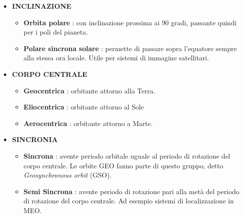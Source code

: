 \documentclass[12pt,a4paper,oneside]{book}
\begin{document}
\begin{itemize}
				\item{\bf INCLINAZIONE}	
					\begin{itemize}
						\item \textbf{Orbita polare} : con inclinazione prossima ai 90 gradi, passante quindi per i poli del pianeta.
						\item \textbf{Polare sincrona solare} : permette di passare sopra l'equatore sempre alla stessa ora locale. Utile per sistemi di immagine satellitari.
					\end{itemize}
					
				\item{\bf CORPO CENTRALE}	
					\begin{itemize}
						\item \textbf{Geocentrica} : orbitante attorno alla Terra.
						\item \textbf{Eliocentrica} : orbitante attorno al Sole
						\item \textbf{Aerocentrica} : orbitante attorno a Marte.
					\end{itemize}
				
				
				\item{\bf SINCRONIA}	
					\begin{itemize}
						\item \textbf{Sincrona} : avente periodo orbitale uguale al periodo di rotazione del corpo centrale. Le orbite GEO fanno parte di questo gruppo, detto \textit{Geosynchronous orbit} (GSO).
						\item \textbf{Semi Sincrona} : avente periodo di rotazione pari alla metà del periodo di rotazione del corpo centrale. Ad esempio sistemi di localizzazione in MEO.
					\end{itemize}
			\end{itemize}								
						
\end{document}
